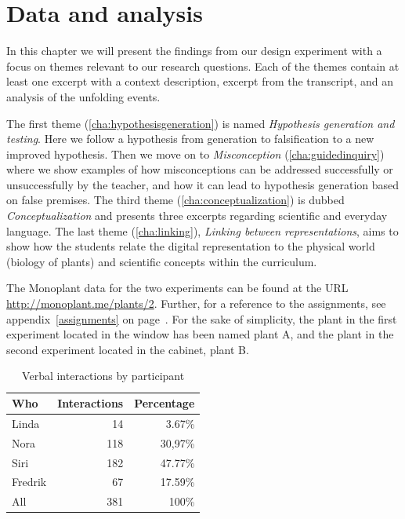 \chapter{Data and analysis}
In this chapter we will present the findings from our design experiment with a focus on themes relevant to our research questions. Each of the themes contain at least one excerpt with a context description, excerpt from the transcript, and an analysis of the unfolding events. 

The first theme (\ref{cha:hypothesisgeneration}) is named \textit{Hypothesis generation and testing}. Here we follow a hypothesis from generation to falsification to a new improved hypothesis. Then we move on to \textit{Misconception} (\ref{cha:guidedinquiry}) where we show examples of how misconceptions can be addressed successfully or unsuccessfully by the teacher, and how it can lead to hypothesis generation based on false premises. The third theme (\ref{cha:conceptualization}) is dubbed \textit{Conceptualization} and presents three excerpts regarding scientific and everyday language. The last theme (\ref{cha:linking}), \textit{Linking between representations}, aims to show how the students relate the digital representation to the physical world (biology of plants) and scientific concepts within the curriculum.  

The Monoplant data for the two experiments can be found at the URL \url{http://monoplant.me/plants/2}. Further, for a reference to the assignments, see appendix~\ref{assignments} on page~\pageref{assignments}. For the sake of simplicity, the plant in the first experiment located in the window has been named plant A, and the plant in the second experiment located in the cabinet, plant B.


\begin{table}[H]
\begin{center}
	\begin{tabular}{l r r } \toprule
	Who &  Interactions  & Percentage\\ \midrule  
	Linda &	 14  & 3.67\% \\
	Nora&	118 & 30,97\% \\ 
	Siri& 	182 & 47.77\% \\
	Fredrik& 67 & 17.59\% \\ \midrule
	All &	381 & 100\%\\
	\bottomrule
	\end{tabular}
\end{center}
\caption{Verbal interactions by participant}
\end{table}

